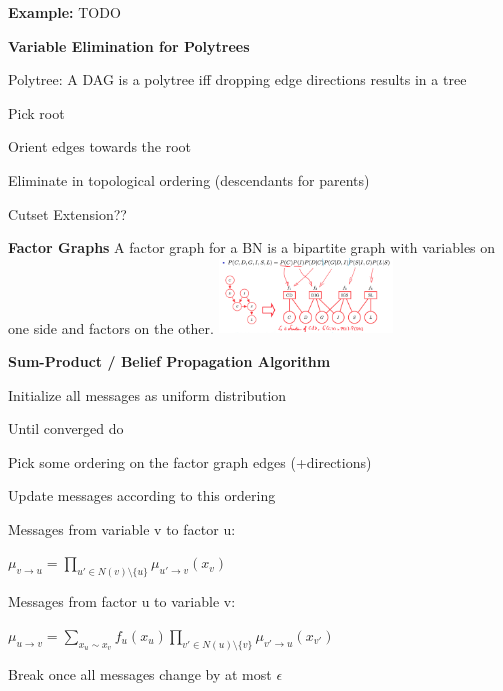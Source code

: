 \documentclass[a4paper, 11pt, landscape]{article}
\begin{document}
\begin{multicols*}{3}
\begin{compactitem}
	\end{compactitem}
	
	\textbf{Example:} TODO
		
	\textbf{Variable Elimination for Polytrees}
	
	Polytree: A DAG is a polytree iff dropping edge directions results in a tree
	\begin{compactitem}
		\item Pick root
		\item Orient edges towards the root
		\item Eliminate in topological ordering (descendants for parents)
	\end{compactitem}

	Cutset Extension??
	
	\textbf{Factor Graphs}
	A factor graph for a BN is a bipartite graph with variables on one side and  factors on the other.
	\includegraphics[height=2cm]{img/pai2.png}
	
	\textbf{Sum-Product / Belief Propagation Algorithm}	
	
	\begin{compactitem}
		\item Initialize all messages as uniform distribution  
		\item Until converged do
		\begin{compactenum}
			\item Pick some ordering on the factor graph edges (+directions)   
			\item Update messages according to this ordering
			
			Messages from variable v to factor u: 
			
			$\mu_{v \rightarrow u} = \prod_{u' \in N(v) \setminus \{u\}} \mu_{u' \rightarrow v}(x_{v})$ 
			
			Messages from factor u to variable v:
			
			$\mu_{u \rightarrow v} = \sum_{x_u \sim x_v} f_u(x_u) \prod_{v' \in N(u) \setminus \{v\}} \mu_{v' \rightarrow u}(x_{v'})$ 

			\item Break once all messages change by at most $\epsilon$
		\end{compactenum}
	\end{compactitem}


\end{multicols*}
\end{document}
